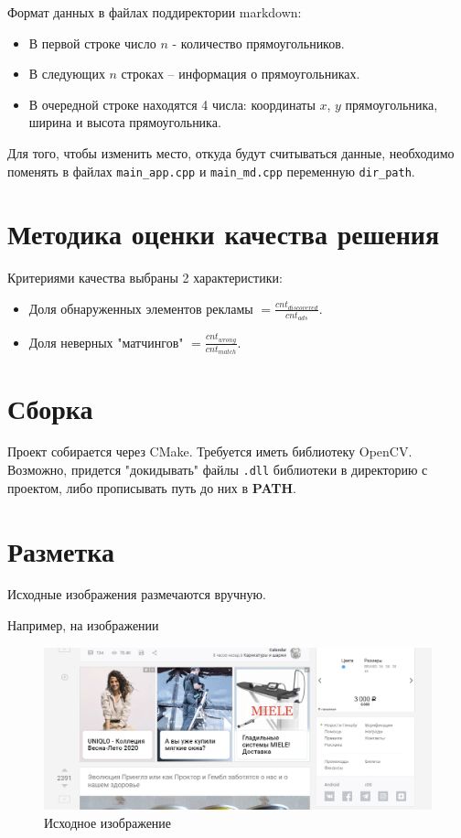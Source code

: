 \documentclass[a4paper,12pt,preview]{report} %
\begin{document}
	
	
	Формат данных в файлах поддиректории markdown:
	
	\begin{itemize}
		\item В первой строке число $n$ - количество прямоугольников.
		\item В следующих $n$ строках -- информация о прямоугольниках. 
		\item В очередной строке находятся 4 числа: координаты $x$, $y$ прямоугольника, ширина и высота прямоугольника. 
	\end{itemize}

	Для того, чтобы изменить место, откуда будут считываться данные, необходимо поменять в файлах \texttt{main\_app.cpp} и \texttt{main\_md.cpp} переменную \texttt{dir\_path}.
	
	
	\section{Методика оценки качества решения}
	
	Критериями качества выбраны 2 характеристики:
	\begin{itemize}
		\item Доля обнаруженных элементов рекламы $= \frac{cnt_{discovered}}{cnt_{ads}}$.
		\item Доля неверных "матчингов" $= \frac{cnt_{wrong}}{cnt_{match}}$.
	\end{itemize}
	



\section{Сборка}

Проект собирается через CMake. Требуется иметь библиотеку OpenCV. Возможно, придется "докидывать" файлы \texttt{.dll} библиотеки в директорию с проектом, либо прописывать путь до них в \textbf{PATH}.

	
	
	\section{Разметка}
	Исходные изображения размечаются вручную.
	
	Например, на изображении
	
	\begin{figure}[H]
		\centering\includegraphics[scale=0.4]{page1.PNG}
		\caption{Исходное изображение}
		\label{fig:page1}
	\end{figure}
\end{document}
